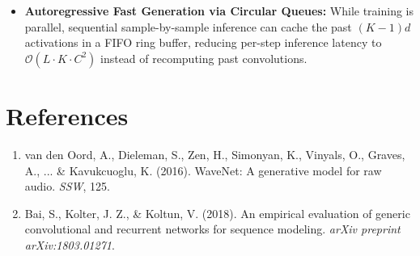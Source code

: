 \documentclass[11pt,a4paper]{article}
\theoremstyle{definition}
\begin{document}
\begin{itemize}
    \item \textbf{Autoregressive Fast Generation via Circular Queues:} While training is parallel, sequential sample-by-sample inference can cache the past $(K-1)d$ activations in a FIFO ring buffer, reducing per-step inference latency to $\mathcal{O}(L \cdot K \cdot C^2)$ instead of recomputing past convolutions.
\end{itemize}

\section{References}
\begin{enumerate}
    \item van den Oord, A., Dieleman, S., Zen, H., Simonyan, K., Vinyals, O., Graves, A., ... \& Kavukcuoglu, K. (2016). WaveNet: A generative model for raw audio. \emph{SSW}, 125.
    \item Bai, S., Kolter, J. Z., \& Koltun, V. (2018). An empirical evaluation of generic convolutional and recurrent networks for sequence modeling. \emph{arXiv preprint arXiv:1803.01271}.
\end{enumerate}
\end{document}
